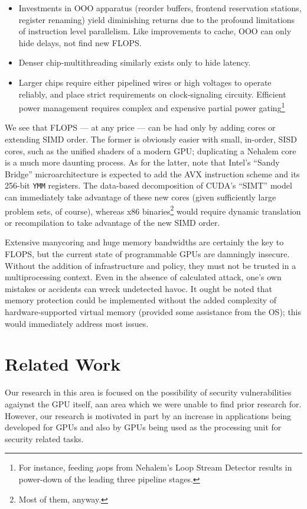 \documentclass[letterpaper,10pt]{article}
\begin{document}
\begin{multicols}{2}
\begin{itemize}
\item Investments in OOO apparatus (reorder buffers,
frontend reservation stations, register renaming) yield diminishing returns due
to the profound limitations of instruction level parallelism\cite{phenn}. Like improvements
to cache, OOO can only hide delays, not find new FLOPS.
\item Denser chip-multithreading similarly exists only to hide latency.
\item Larger chips require either pipelined wires or high voltages to operate
reliably, and place strict requirements on clock-signaling circuity. Efficient
power management requires complex and expensive partial power gating\footnote{For
instance, feeding $\mu$ops from Nehalem's Loop Stream Detector results in power-down
of the leading three pipeline stages.}
\end{itemize}
We see that FLOPS --- at any price --- can be had only by adding cores or extending
SIMD order. The former is obviously easier with small, in-order, SISD cores,
such as the unified shaders of a modern GPU; duplicating a Nehalem core is a
much more daunting process. As for the latter, note that Intel's ``Sandy
Bridge'' microarchitecture is expected to add the AVX instruction scheme and
its 256-bit \texttt{YMM} registers. The data-based decomposition of CUDA's
``SIMT'' model can immediately take advantage of these new cores (given
sufficiently large problem sets, of course), whereas x86 binaries\footnote{Most of them, anyway.} would
require dynamic translation or recompilation to take advantage of the new SIMD
order.

Extensive manycoring and huge memory bandwidths are certainly the key to FLOPS,
but the current state of programmable GPUs are damningly insecure. Without the
addition of infrastructure and policy, they must not be trusted in a
multiprocessing context. Even in the absence of calculated attack, one's own
mistakes or accidents can wreck undetected havoc. It ought be noted that memory
protection could be implemented without the added complexity of
hardware-supported virtual memory (provided some assistance from the OS); this
would immediately address most issues.

\section{Related Work}
Our research in this area is focused on the possibility of security
vulnerabilities agaiynst the GPU itself, aan area which we were unable to find
prior research for. However, our research is motivated in part by an increase
in applications being developed for GPUs and also by GPUs being used as the
processing unit for security related tasks.
  

\end{multicols}
\end{document}
